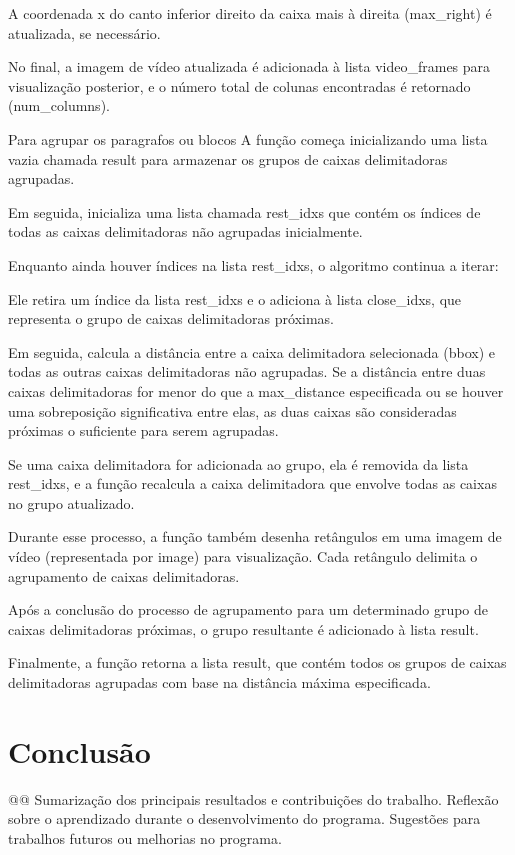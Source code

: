 \documentclass[english, 
               brazil, 
               bsc] %
               {dcomp-abntex2}
\begin{document}
A coordenada x do canto inferior direito da caixa mais à direita (max\_right) é atualizada, se necessário.

No final, a imagem de vídeo atualizada é adicionada à lista video\_frames para visualização posterior, e o número total de colunas encontradas é retornado (num\_columns).


Para agrupar os paragrafos ou blocos A função começa inicializando uma lista vazia chamada result para armazenar os grupos de caixas delimitadoras agrupadas.

Em seguida, inicializa uma lista chamada rest\_idxs que contém os índices de todas as caixas delimitadoras não agrupadas inicialmente.

Enquanto ainda houver índices na lista rest\_idxs, o algoritmo continua a iterar:

Ele retira um índice da lista rest\_idxs e o adiciona à lista close\_idxs, que representa o grupo de caixas delimitadoras próximas.

Em seguida, calcula a distância entre a caixa delimitadora selecionada (bbox) e todas as outras caixas delimitadoras não agrupadas. Se a distância entre duas caixas delimitadoras for menor do que a max\_distance especificada ou se houver uma sobreposição significativa entre elas, as duas caixas são consideradas próximas o suficiente para serem agrupadas.

Se uma caixa delimitadora for adicionada ao grupo, ela é removida da lista rest\_idxs, e a função recalcula a caixa delimitadora que envolve todas as caixas no grupo atualizado.

Durante esse processo, a função também desenha retângulos em uma imagem de vídeo (representada por image) para visualização. Cada retângulo delimita o agrupamento de caixas delimitadoras.

Após a conclusão do processo de agrupamento para um determinado grupo de caixas delimitadoras próximas, o grupo resultante é adicionado à lista result.

Finalmente, a função retorna a lista result, que contém todos os grupos de caixas delimitadoras agrupadas com base na distância máxima especificada.




\chapter{Conclusão}

@@
Sumarização dos principais resultados e contribuições do trabalho.
Reflexão sobre o aprendizado durante o desenvolvimento do programa.
Sugestões para trabalhos futuros ou melhorias no programa.









\postextual


\renewcommand{\chapnumfont}{\chaptitlefont}
\renewcommand{\afterchapternum}{}
% 
% 
\end{document}
